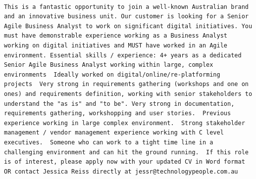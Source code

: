 \documentclass[11pt,a4paper,]{article}
\begin{document}
\begin{verbatim}
                                                                                                                                                                                                                 This is a fantastic opportunity to join a well-known Australian brand and an innovative business unit. Our customer is looking for a Senior Agile Business Analyst to work on significant digital initiatives. You must have demonstrable experience working as a Business Analyst working on digital initiatives and MUST have worked in an Agile environment. Essential skills / experience: 4+ years as a dedicated Senior Agile Business Analyst working within large, complex environments  Ideally worked on digital/online/re-platforming projects  Very strong in requirements gathering (workshops and one on ones) and requirements definition, working with senior stakeholders to understand the "as is" and "to be". Very strong in documentation, requirements gathering, workshopping and user stories.  Previous experience working in large complex environment.  Strong stakeholder management / vendor management experience working with C level executives.  Someone who can work to a tight time line in a challenging environment and can hit the ground running.  If this role is of interest, please apply now with your updated CV in Word format OR contact Jessica Reiss directly at jessr@technologypeople.com.au

\end{verbatim}
\end{document}

